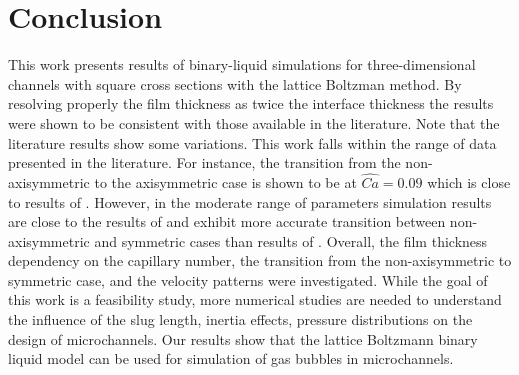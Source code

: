 \documentclass[preprint,12pt]{elsarticle}
\begin{document}
\section{Conclusion}
This work presents results of binary-liquid simulations for three-dimensional channels with square
cross sections with the lattice Boltzman method. By resolving properly the film thickness as twice the
interface thickness \cite{kuzmin-binary2d} the results were shown to be consistent with those
available in the literature. Note that the literature results show some variations. This work falls
within the range of data presented in the literature. For instance, the  transition from the
non-axisymmetric to the
axisymmetric case is shown to be at $\widehat{Ca}=0.09$ which is close to results of
\citet{wang-non-circular}. However, in the moderate range of parameters simulation results are
close to the results of \citet{heil-threedim} and exhibit more accurate transition between
non-axisymmetric and symmetric cases than results of \citet{wang-non-circular}. Overall, the film
thickness dependency on the capillary number, the
transition from the non-axisymmetric to symmetric case, and the velocity patterns were investigated.
While
the goal of this work is a feasibility study, more numerical studies are needed to
understand the influence of the slug length, inertia effects, pressure distributions
\cite{kreutzer-taylor,yue-mass} on the design of microchannels. Our results show that the lattice
Boltzmann binary liquid model can be used for simulation of gas bubbles in microchannels. 

\appendix
\end{document}
